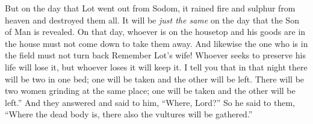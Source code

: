 \begin{biblechapter}
\verse But on the day that Lot went out from Sodom, it rained fire and sulphur from heaven and destroyed them all.
\verse It will be \textit{just the same} on the day that the Son of Man is revealed.
\verse On that day, whoever is on the housetop and his goods are in the house must not come down to take them away. And likewise the one who is in the field must not turn back
\verse Remember Lot’s wife!
\verse Whoever seeks to preserve his life will lose it, but whoever loses it will keep it.
\verse I tell you that in that night there will be two in one bed; one will be taken and the other will be left.
\verse There will be two women grinding at the same place; one will be taken and the other will be left.”
\verse And they answered and said to him, “Where, Lord?” So he said to them, “Where the dead body is, there also the vultures will be gathered.”
\end{biblechapter}

